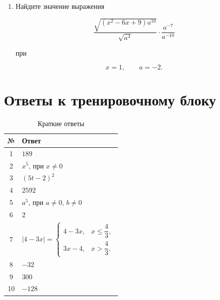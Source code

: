 \documentclass[a4paper,12pt]{article}
\begin{document}
\begin{enumerate}[label=\textbf{\arabic*.},resume]

\item
Найдите значение выражения

\[
\frac{
\sqrt{(x^2-6x+9)a^{10}}
}{
\sqrt{a^4}
}
\cdot
\frac{a^{-7}}{a^{-10}}
\]

при

\[
x=1,
\qquad
a=-2.
\]

\end{enumerate}


\clearpage
\section*{Ответы к тренировочному блоку}

\begin{table}[ht]
\centering
\caption{Краткие ответы}

\begin{tabularx}{\linewidth}{@{}cX@{}}

\toprule
\textbf{№} & \textbf{Ответ} \\
\midrule

1 & $189$ \\

2 & $x^5$, при $x\ne0$ \\

3 & $(5t-2)^2$ \\

4 & $2592$ \\

5 & $a^5$, при $a\ne0$, $b\ne0$ \\

6 & $2$ \\

7 &
$\displaystyle
|4-3x|=
\begin{cases}
4-3x, & x\le\dfrac43,\\
3x-4, & x>\dfrac43.
\end{cases}
$ \\

8 & $-32$ \\

9 & $300$ \\

10 & $-128$ \\

\bottomrule

\end{tabularx}
\end{table}
\end{document}
